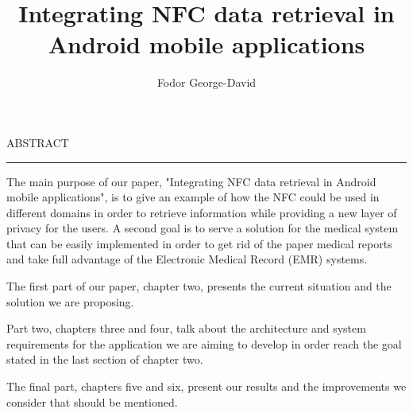 \documentclass[12pt]{report}
\begin{document}
\title{Integrating NFC data retrieval in Android mobile applications}					   
\author{Fodor George-David}											
				
\maketitle


\newpage
\thispagestyle{empty}
\mbox{}
\newpage
{} 

\cleardoublepage
ABSTRACT
\vspace{0.5cm}	
\hrule
\vspace{0.5cm}	

The main purpose of our paper, "Integrating NFC data retrieval in Android mobile applications", is to give an example of how the NFC could be used in different domains in order to retrieve information while providing a new layer of privacy for the users. A second goal is to serve a solution for the medical system that can be easily implemented in order to get rid of the paper medical reports and take full advantage of the Electronic Medical Record (EMR) systems.

The first part of our paper, chapter two, presents the current situation and the solution we are proposing.

Part two, chapters three and four, talk about the architecture and system requirements for the application we are aiming to develop in order reach the goal stated in the last section of chapter two.

The final part, chapters five and six, present our results and the improvements we consider that should be mentioned.

\tableofcontents


\newpage
{}












\end{document}
